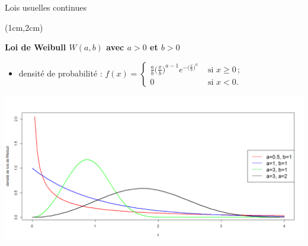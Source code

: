 \documentclass{beamer}
\begin{document}
\begin{frame}{Lois usuelles continues}
\begin{textblock*}{\textwidth}(1cm,2cm)

\begin{center}{\bf \Large Loi de Weibull $W(a,b)$ avec $a>0$ et $b>0$} \end{center}
\begin{itemize}
\item \small densité de probabilité  :
$
f(x)=
\begin{cases}
\frac{a}{b} \big( \frac{x}{b} \big)^{a-1} e^{ - \big( \frac{x}{b} \big)^{a} } &{\mbox { si }} x\geq 0\, ;\\
0 & \mbox { si } x<0.
\end{cases}
$
\end{itemize}


\begin{center}
\includegraphics[scale=0.22]{images/densite_weibull.png}
\end{center}

\end{textblock*}

\end{frame}

\end{document}
